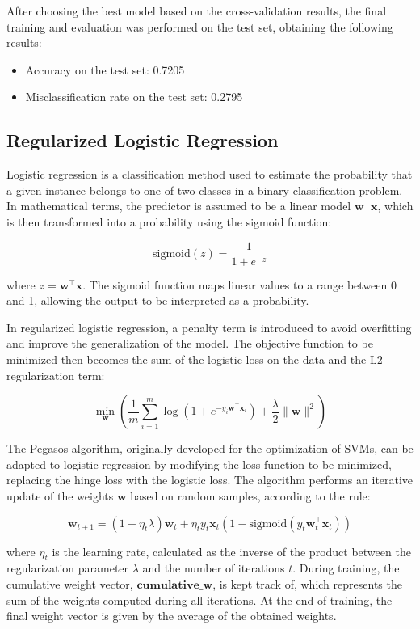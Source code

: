 \documentclass[a4paper, 10pt]{article}
\begin{document}
After choosing the best model based on the cross-validation results, the final training and evaluation was performed on the test set, obtaining the following results:
\begin{itemize}
    \item Accuracy on the test set: 0.7205
    \item Misclassification rate on the test set: 0.2795
\end{itemize}

\newpage
\subsection{Regularized Logistic Regression}

Logistic regression is a classification method used to estimate the probability that a given instance belongs to one of two classes in a binary classification problem. In mathematical terms, the predictor is assumed to be a linear model \(\mathbf{w}^\top \mathbf{x}\), which is then transformed into a probability using the sigmoid function:

\[
\text{sigmoid}(z) = \frac{1}{1 + e^{-z}}
\]

where \(z = \mathbf{w}^\top \mathbf{x}\). The sigmoid function maps linear values to a range between 0 and 1, allowing the output to be interpreted as a probability.

In regularized logistic regression, a penalty term is introduced to avoid overfitting and improve the generalization of the model. The objective function to be minimized then becomes the sum of the logistic loss on the data and the L2 regularization term:

\[
\min_{\mathbf{w}} \left( \frac{1}{m} \sum_{i=1}^m \log(1 + e^{-y_i \mathbf{w}^\top \mathbf{x}_i}) + \frac{\lambda}{2} \|\mathbf{w}\|^2 \right)
\]

The Pegasos algorithm, originally developed for the optimization of SVMs, can be adapted to logistic regression by modifying the loss function to be minimized, replacing the hinge loss with the logistic loss. The algorithm performs an iterative update of the weights \(\mathbf{w}\) based on random samples, according to the rule:

\[
\mathbf{w}_{t+1} = (1 - \eta_t \lambda) \mathbf{w}_t + \eta_t y_t \mathbf{x}_t \left( 1 - \text{sigmoid}(y_t \mathbf{w}_t^\top \mathbf{x}_t) \right)
\]

where \(\eta_t\) is the learning rate, calculated as the inverse of the product between the regularization parameter \(\lambda\) and the number of iterations \(t\). During training, the cumulative weight vector, \(\mathbf{cumulative\_w}\), is kept track of, which represents the sum of the weights computed during all iterations. At the end of training, the final weight vector is given by the average of the obtained weights.
\end{document}
